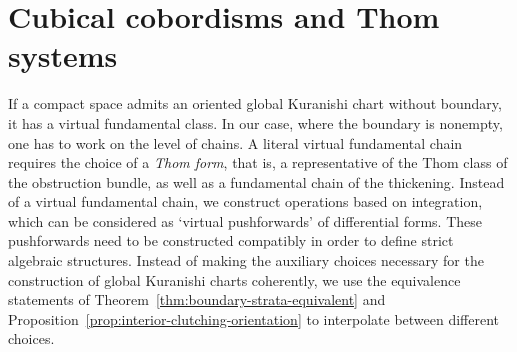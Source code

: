 \documentclass[11pt,psamsfonts, oneside, reqno]{amsart}
\theoremstyle{definition}
\theoremstyle{remark}
\numberwithin{equation}{section}
\begin{document}
\section{Cubical cobordisms and Thom systems}\label{subsec:cubical-cobordisms}
If a compact space admits an oriented global Kuranishi chart without boundary, it has a virtual fundamental class. In our case, where the boundary is nonempty, one has to work on the level of chains. A literal virtual fundamental chain requires the choice of a \emph{Thom form}, that is, a representative of the Thom class of the obstruction bundle, as well as a fundamental chain of the thickening.
Instead of a virtual fundamental chain, we construct operations based on integration, which can be considered as `virtual pushforwards' of differential forms. These pushforwards need to be constructed compatibly in order to define strict algebraic structures. Instead of making the auxiliary choices necessary for the construction of global Kuranishi charts coherently, we use the equivalence statements of Theorem~\ref{thm:boundary-strata-equivalent} and Proposition~\ref{prop:interior-clutching-orientation} to interpolate between different choices.
\end{document}
